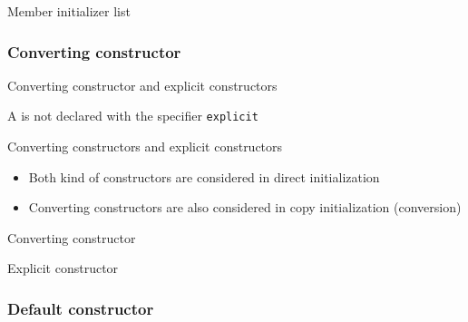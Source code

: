 \begin{frame}{Member initializer list}{}
  \begin{example}
  \end{example}
\end{frame}

\subsubsection{Converting constructor}

\begin{frame}{Converting constructor and explicit constructors}{}
  \begin{definition}
    A  is not declared with the specifier \lstinline!explicit!
  \end{definition}

  \begin{block}{Converting constructors and explicit constructors}
    \begin{itemize}
    \item
      Both kind of constructors are considered in direct initialization
    \item
      Converting constructors are also considered in copy initialization (conversion)
    \end{itemize}
  \end{block}
\end{frame}

\begin{frame}{Converting constructor}{}
  \begin{example}
  \end{example}
\end{frame}

\begin{frame}{Explicit constructor}{}
  \begin{example}
  \end{example}
\end{frame}

\subsubsection{Default constructor}

